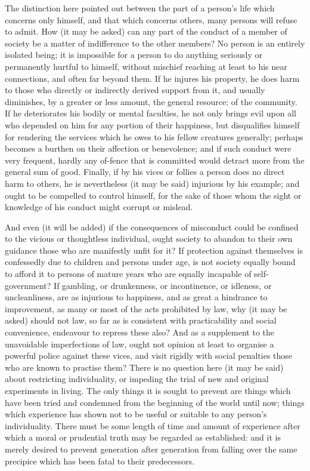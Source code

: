 \documentclass[11pt,openany]{book}
\begin{document}
The distinction here pointed out between the part of a person's life which concerns only himself, and that which concerns others, many persons will refuse to admit. How (it may be asked) can any part of the conduct of a member of society be a matter of indifference to the other members? No person is an entirely isolated being; it is impossible for a person to do anything seriously or permanently hurtful to himself, without mischief reaching at least to his near connections, and often far beyond them. If he injures his property, he does harm to those who directly or indirectly derived support from it, and usually diminishes, by a greater or less amount, the general resource; of the community. If he deteriorates his bodily or mental faculties, he not only brings evil upon all who depended on him for any portion of their happiness, but disqualifies himself for rendering the services which he owes to his fellow creatures generally; perhaps becomes a burthen on their affection or benevolence; and if such conduct were very frequent, hardly any of-fence that is committed would detract more from the general sum of good. Finally, if by his vices or follies a person does no direct harm to others, he is nevertheless (it may be said) injurious by his example; and ought to be compelled to control himself, for the sake of those whom the sight or knowledge of his conduct might corrupt or mislead.

And even (it will be added) if the consequences of misconduct could be confined to the vicious or thoughtless individual, ought society to abandon to their own guidance those who are manifestly unfit for it? If protection against themselves is confessedly due to children and persons under age, is not society equally bound to afford it to persons of mature years who are equally incapable of self-government? If gambling, or drunkenness, or incontinence, or idleness, or uncleanliness, are as injurious to happiness, and as great a hindrance to improvement, as many or most of the acts prohibited by law, why (it may be asked) should not law, so far as is consistent with practicability and social convenience, endeavour to repress these also? And as a supplement to the unavoidable imperfections of law, ought not opinion at least to organise a powerful police against these vices, and visit rigidly with social penalties those who are known to practise them? There is no question here (it may be said) about restricting individuality, or impeding the trial of new and original experiments in living. The only things it is sought to prevent are things which have been tried and condemned from the beginning of the world until now; things which experience has shown not to be useful or suitable to any person's individuality. There must be some length of time and amount of experience after which a moral or prudential truth may be regarded as established: and it is merely desired to prevent generation after generation from falling over the same precipice which has been fatal to their predecessors.
\end{document}
